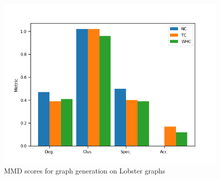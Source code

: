 \begin{figure}
    \centering
    \includegraphics[width=0.9\linewidth]{lobster_graph_gen.png}
    \vspace{-15pt}
    \caption{MMD scores for graph generation on Lobster graphs}
    \label{fig:lobster_graph_gen}
    \vspace{-15pt}
\end{figure}
